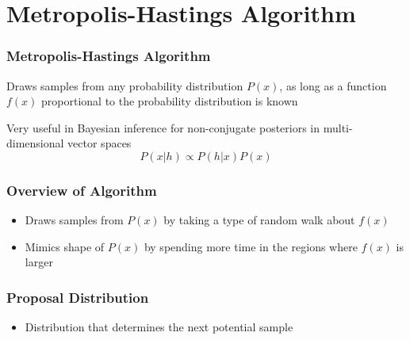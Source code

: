 \section{Metropolis-Hastings Algorithm}

\begin{frame}
  \frametitle{Metropolis-Hastings Algorithm}
  \begin{center}
    Draws samples from any probability distribution $P(x)$, as long as a
    function $f(x)$ proportional to the probability distribution is known
    \vspace{4em}

    Very useful in Bayesian inference for non-conjugate posteriors in
    multi-dimensional vector spaces
    \[P(x|h) \propto P(h|x) P(x)\]
  \end{center}
\end{frame}

\begin{frame}
  \frametitle{Overview of Algorithm}
  \begin{itemize}
  \item Draws samples from $P(x)$ by taking a type of random walk about $f(x)$
  \item Mimics shape of $P(x)$ by spending more time in the regions where $f(x)$
    is larger
  \end{itemize}
\end{frame}

\begin{frame}
  \frametitle{Proposal Distribution}
  \begin{itemize}
  \item Distribution that determines the next potential sample
  \end{itemize}
\end{frame}
